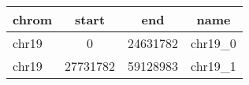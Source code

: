 \documentclass{standalone}
\begin{document}
\begin{tabular}{|l|c|c|c|}
\toprule
chrom & start & end & name \\
\midrule
chr19 & 0 & 24631782 & chr19\_0 \\
chr19 & 27731782 & 59128983 & chr19\_1 \\
\bottomrule
\end{tabular}
\end{document}
